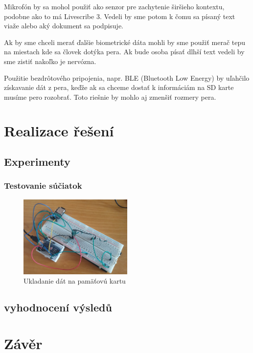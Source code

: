 Mikrofón by sa mohol použiť ako senzor pre zachytenie širšieho kontextu, podobne ako to má Livescribe 3. Vedeli by sme potom k čomu sa písaný text viaže alebo aký dokument sa podpisuje. 

Ak by sme chceli merať ďalšie biometrické dáta mohli by sme použiť merač tepu na miestach kde sa človek dotýka pera. Ak bude osoba písať dlhší text vedeli by sme zistiť nakoľko je nervózna. 

Použitie bezdrôtového pripojenia, napr. BLE (Bluetooth Low Energy) by uľahčilo získavanie dát z pera, keďže ak sa chceme dostať k informáciám na SD karte musíme pero rozobrať. Toto riešnie by mohlo aj zmenšiť rozmery pera.

\chapter{Realizace řešení}

\section{Experimenty}

\subsection*{Testovanie súčiatok}

\begin{figure}[hbt]
	\centering
	\includegraphics[width=0.5\textwidth]{obrazky-figures/FSRtestSD.png}
	\caption{Ukladanie dát na pamäťovú kartu}
	\label{Experiment1}
\end{figure}

\section{vyhodnocení výsledů}

\chapter{Závěr}

\label{zaver}

